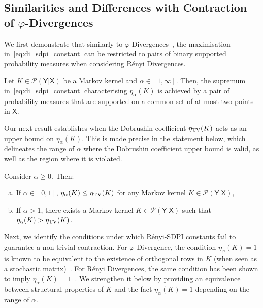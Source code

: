 \documentclass[conference,letterpaper]{IEEEtran}
\def \X{\mathsf X}
\def \Y{\mathsf Y}
\def \calP{\mathcal P}
\begin{document}
\subsection{Similarities and Differences with Contraction of \mbox{$\varphi$-Divergences}}\noindent
We first demonstrate that similarly to $\varphi$-Divergences~\cite{ordentlich2021strong}, the maximisation in~\cref{eq:di_sdpi_constant} can be restricted to pairs of binary supported probability measures when considering R\'enyi Divergences.
\begin{theorem}\label{prop:eta_parameter_renyi_binary}
    Let $K\in\calP(\Y|\X)$ be a Markov kernel and $\alpha\in[1, \infty]$. Then, the supremum in~\cref{eq:di_sdpi_constant} characterising $\eta_\alpha(K)$ is achieved by a pair of probability measures that are supported on a common set of at most two points in $\X$.
\end{theorem}
Our next result establishes when the Dobrushin coefficient $\eta_{\rm TV}(K)$ acts as an upper bound on $\eta_\alpha(K)$. This is made precise in the statement below, which delineates the range of $\alpha$ where the Dobrushin coefficient upper bound is valid, as well as the region where it is violated. 
\begin{proposition}\label{prop:bound_on_distribution_independent_sdpi}
    Consider $\alpha\geq 0$. Then:
    \begin{enumerate}[a)]
        \item If $\alpha\in[0,1]$, $\eta_{\alpha}(K) \leq \eta_{\rm TV}(K)$ for any Markov kernel $K\in\calP(\Y|\X)$,
        \item If $\alpha>1$, there exists a Markov kernel $K\in\calP(\Y|\X)$ such that $\eta_{\alpha}(K) > \eta_{\rm TV}(K)$.
    \end{enumerate}
\end{proposition}
Next, we identify the conditions under which R\'enyi-SDPI constants fail to guarantee a non-trivial contraction. For $\varphi$-Divergence, the condition $\eta_\varphi(K)=1$ is known to be equivalent to the existence of orthogonal rows in $K$ (when seen as a stochastic matrix)~\cite{cohen1993relative}. For R\'enyi Divergences, the same condition has been shown to imply $\eta_\alpha(K)=1$~\cite[Proposition 3]{grosse2025bounds}. We strengthen it below by providing an equivalence between structural properties of $K$ and the fact $\eta_\alpha(K)=1$ depending on the range of $\alpha$.
\end{document}
